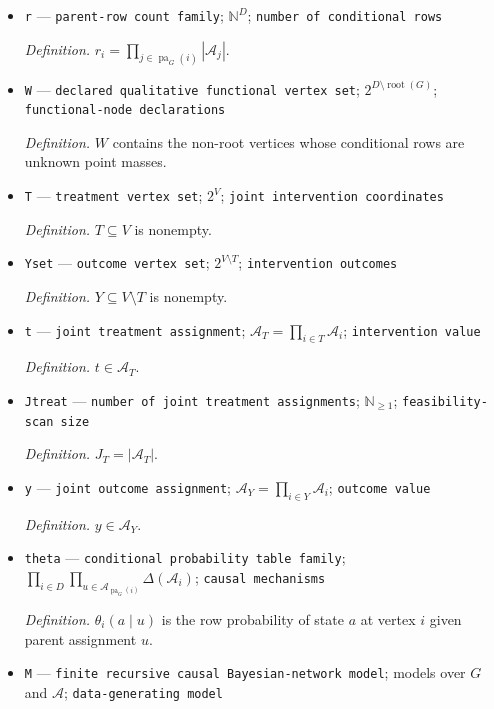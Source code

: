 \documentclass{article}
\begin{document}
\begin{itemize}
  \item \texttt{r} --- \texttt{parent-\allowbreak{}row count family}; \(\mathbb N^D\); \texttt{number of conditional rows}
  \par\smallskip\noindent\emph{Definition.} \(r_i=\prod_{j\in\operatorname{pa}_G(i)}|\mathcal A_j|\).
  \item \texttt{W} --- \texttt{declared qualitative functional vertex set}; \(2^{D\setminus\operatorname{root}(G)}\); \texttt{functional-\allowbreak{}node declarations}
  \par\smallskip\noindent\emph{Definition.} \(W\) contains the non-root vertices whose conditional rows are unknown point masses.
  \item \texttt{T} --- \texttt{treatment vertex set}; \(2^{V}\); \texttt{joint intervention coordinates}
  \par\smallskip\noindent\emph{Definition.} \(T\subseteq V\) is nonempty.
  \item \texttt{Yset} --- \texttt{outcome vertex set}; \(2^{V\setminus T}\); \texttt{intervention outcomes}
  \par\smallskip\noindent\emph{Definition.} \(Y\subseteq V\setminus T\) is nonempty.
  \item \texttt{t} --- \texttt{joint treatment assignment}; \(\mathcal A_T=\prod_{i\in T}\mathcal A_i\); \texttt{intervention value}
  \par\smallskip\noindent\emph{Definition.} \(t\in\mathcal A_T\).
  \item \texttt{Jtreat} --- \texttt{number of joint treatment assignments}; \(\mathbb N_{\ge 1}\); \texttt{feasibility-\allowbreak{}scan size}
  \par\smallskip\noindent\emph{Definition.} \(J_T=|\mathcal A_T|\).
  \item \texttt{y} --- \texttt{joint outcome assignment}; \(\mathcal A_Y=\prod_{i\in Y}\mathcal A_i\); \texttt{outcome value}
  \par\smallskip\noindent\emph{Definition.} \(y\in\mathcal A_Y\).
  \item \texttt{theta} --- \texttt{conditional probability table family}; \(\prod_{i\in D}\prod_{u\in\mathcal A_{\operatorname{pa}_G(i)}}\Delta(\mathcal A_i)\); \texttt{causal mechanisms}
  \par\smallskip\noindent\emph{Definition.} \(\theta_i(a\mid u)\) is the row probability of state \(a\) at vertex \(i\) given parent assignment \(u\).
  \item \texttt{M} --- \texttt{finite recursive causal Bayesian-\allowbreak{}network model}; models over \(G\) and \(\mathcal A\); \texttt{data-\allowbreak{}generating model}

\end{itemize}
\end{document}
